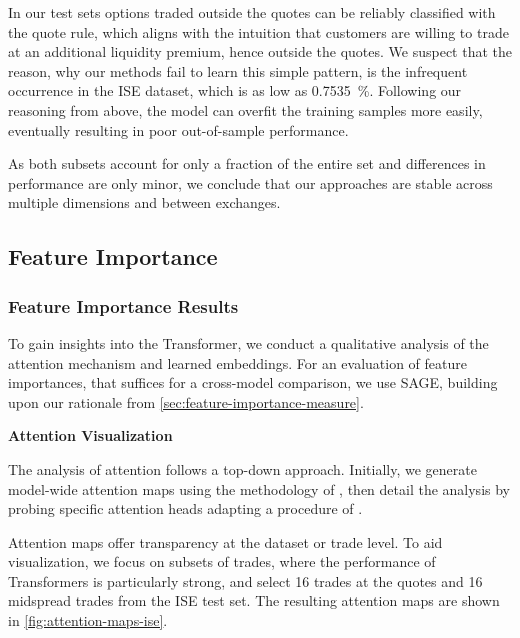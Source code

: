 In our test sets options traded outside the quotes can be reliably classified with the quote rule, which aligns with the intuition that customers are willing to trade at an additional liquidity premium, hence outside the quotes. We suspect that the reason, why our methods fail to learn this simple pattern, is the infrequent occurrence in the \gls{ISE} dataset, which is as low as \SI{0.7535}{\percent}. Following our reasoning from above, the model can overfit the training samples more easily, eventually resulting in poor out-of-sample performance. 

As both subsets account for only a fraction of the entire set and differences in performance are only minor, we conclude that our approaches are stable across multiple dimensions and between exchanges.

\subsection{Feature Importance}\label{sec:feature-importance}

\subsubsection{Feature Importance Results}\label{sec:feature-importance-results}

To gain insights into the Transformer, we conduct a qualitative analysis of the attention mechanism and learned embeddings. For an evaluation of feature importances, that suffices for a cross-model comparison, we use \gls{SAGE}, building upon our rationale from \cref{sec:feature-importance-measure}.

\vskip 1.3in

\textbf{Attention Visualization}

The analysis of attention follows a top-down approach. Initially, we generate model-wide attention maps using the methodology of \textcite[][784--786]{cheferTransformerInterpretabilityAttention2021}, then detail the analysis by probing specific attention heads adapting a procedure of \textcite[][279]{clarkWhatDoesBERT2019}.

Attention maps offer transparency at the dataset or trade level. To aid visualization, we focus on subsets of trades, where the performance of Transformers is particularly strong, and select \num{16} trades at the quotes and \num{16} midspread trades from the \gls{ISE} test set. The resulting attention maps are shown in \cref{fig:attention-maps-ise}.

